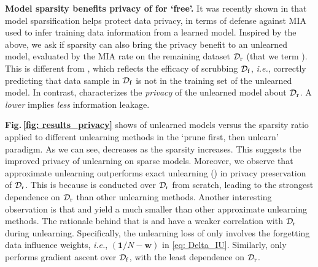 \noindent \textbf{Model sparsity benefits privacy of {\MU} for `free'.}
It was  recently shown in \cite{huang2020privacy,wang2020against} that model sparsification helps protect data privacy, in terms of defense against MIA  used to infer training data  information   from a learned model. Inspired by the above, we ask if sparsity can also bring  the privacy benefit to an unlearned model, evaluated by  the MIA rate on the remaining dataset $\mathcal D_\mathrm{r}$ (that we term \textbf{\MIAR}).  This is different from  {\MIAF}, which
reflects the efficacy of scrubbing ${\mathcal D_\mathrm{f}}$, \textit{i.e.}, correctly predicting that    data sample in ${\mathcal D_\mathrm{f}}$ is not in the training set of the unlearned model. In contrast, 
{\MIAR}  characterizes the   \textit{privacy}   of the unlearned model about $\mathcal D_\mathrm{r}$. A \textit{lower} {\MIAR}   implies \textit{less} information leakage.



\textbf{Fig.\,\ref{fig: results_privacy}} shows {\MIAR} of
unlearned models versus the   sparsity ratio applied to different   unlearning methods in the `prune first, then unlearn' paradigm. 
As we can see, 
{\MIAR} decreases as the sparsity   increases. This suggests the improved  privacy 
of  unlearning on sparse models.
Moreover, we observe that approximate unlearning outperforms exact unlearning ({\retrain}) in   privacy preservation of $\mathcal D_\mathrm{r}$. This is because {\retrain}  is conducted over ${\mathcal D_\mathrm{r}}$ from scratch, leading to the strongest dependence on ${\mathcal D_\mathrm{r}}$ than other unlearning methods.  Another interesting observation is that {\IU} and {\GA} yield a much smaller  {\MIAR}  than other approximate unlearning methods. The rationale behind that is   {\IU} and {\GA} have a weaker correlation with ${\mathcal D_\mathrm{r}}$ during unlearning. Specifically,  the unlearning loss of {\IU}  only involves the forgetting data influence weights, \textit{i.e.}, $(\mathbf 1/N - \mathbf w)$ in \eqref{eq: Delta_IU}.
Similarly, {\GA} only performs gradient ascent   over $\mathcal D_\mathrm{f}$, with the least dependence on $\mathcal D_\mathrm{r}$.  




